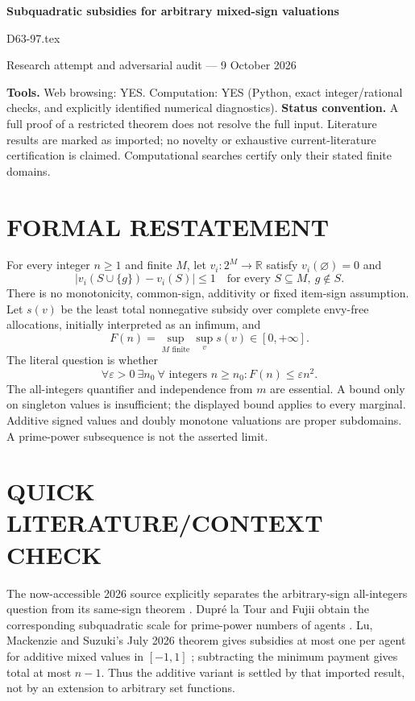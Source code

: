 \documentclass[11pt,a4paper]{article}
\theoremstyle{remark}\newtheorem{remark}[theorem]{Remark}
\newcommand{\R}{\mathbb R}
\begin{document}
\begin{center}
{\LARGE\bfseries Subquadratic subsidies for arbitrary mixed-sign valuations}\par\medskip
{\large D63-97.tex}\par
Research attempt and adversarial audit --- 9 October 2026
\end{center}
\label{problem:OP-0592}
\label{audited:ECON-005}
\label{audited:conventions}
\textbf{Tools.} Web browsing: YES. Computation: YES (Python, exact integer/rational checks, and explicitly identified numerical diagnostics).
\textbf{Status convention.} A full proof of a restricted theorem does not resolve the full input. Literature results are marked as imported; no novelty or exhaustive current-literature certification is claimed. Computational searches certify only their stated finite domains.

\section{FORMAL RESTATEMENT}
For every integer $n\ge1$ and finite $M$, let $v_i:2^M\to\R$ satisfy $v_i(\varnothing)=0$ and
\[
|v_i(S\cup\{g\})-v_i(S)|\le1\quad\text{for every }S\subseteq M,\ g\notin S.
\]
There is no monotonicity, common-sign, additivity or fixed item-sign assumption. Let $s(v)$ be the least total nonnegative subsidy over complete envy-free allocations, initially interpreted as an infimum, and
\[
F(n)=\sup_{M\text{ finite}}\sup_v s(v)\in[0,+\infty].
\]
The literal question is whether
\[
\forall\varepsilon>0\ \exists n_0\ \forall\text{ integers }n\ge n_0:
F(n)\le\varepsilon n^2.
\]
The all-integers quantifier and independence from $m$ are essential. A bound only on singleton values is insufficient; the displayed bound applies to every marginal. Additive signed values and doubly monotone valuations are proper subdomains. A prime-power subsequence is not the asserted limit.

\section{QUICK LITERATURE/CONTEXT CHECK}
The now-accessible 2026 source explicitly separates the arbitrary-sign all-integers question from its same-sign theorem \cite{subq}. Dupr\'e la Tour and Fujii obtain the corresponding subquadratic scale for prime-power numbers of agents \cite{prime}. Lu, Mackenzie and Suzuki's July 2026 theorem gives subsidies at most one per agent for additive mixed values in $[-1,1]$ \cite{mixed}; subtracting the minimum payment gives total at most $n-1$. Thus the additive variant is settled by that imported result, not by an extension to arbitrary set functions.
\end{document}
